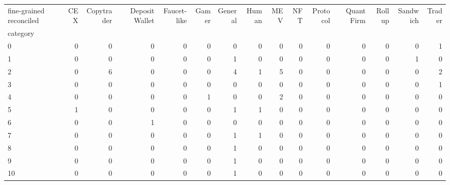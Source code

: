 \begin{tabular}{lrrrrrrrrrrrrrr}
\toprule
fine-grained reconciled &  CEX &  Copytrader &  Deposit Wallet &  Faucet-like &  Gamer &  General &  Human &  MEV &  NFT &  Protocol &  Quant Firm &  Rollup &  Sandwich &  Trader \\
category &      &             &                 &              &        &          &        &      &      &           &             &         &           &         \\
\midrule
0        &    0 &           0 &               0 &            0 &      0 &        0 &      0 &    0 &    0 &         0 &           0 &       0 &         0 &       1 \\
1        &    0 &           0 &               0 &            0 &      0 &        1 &      0 &    0 &    0 &         0 &           0 &       0 &         1 &       0 \\
2        &    0 &           6 &               0 &            0 &      0 &        4 &      1 &    5 &    0 &         0 &           0 &       0 &         0 &       2 \\
3        &    0 &           0 &               0 &            0 &      0 &        0 &      0 &    0 &    0 &         0 &           0 &       0 &         0 &       1 \\
4        &    0 &           0 &               0 &            0 &      1 &        0 &      0 &    2 &    0 &         0 &           0 &       0 &         0 &       0 \\
5        &    1 &           0 &               0 &            0 &      0 &        1 &      1 &    0 &    0 &         0 &           0 &       0 &         0 &       0 \\
6        &    0 &           0 &               1 &            0 &      0 &        0 &      0 &    0 &    0 &         0 &           0 &       0 &         0 &       0 \\
7        &    0 &           0 &               0 &            0 &      0 &        1 &      1 &    0 &    0 &         0 &           0 &       0 &         0 &       0 \\
8        &    0 &           0 &               0 &            0 &      0 &        1 &      0 &    0 &    0 &         0 &           0 &       0 &         0 &       0 \\
9        &    0 &           0 &               0 &            0 &      0 &        1 &      0 &    0 &    0 &         0 &           0 &       0 &         0 &       0 \\
10       &    0 &           0 &               0 &            0 &      0 &        1 &      0 &    0 &    0 &         0 &           0 &       0 &         0 &       0 \\

\end{tabular}
